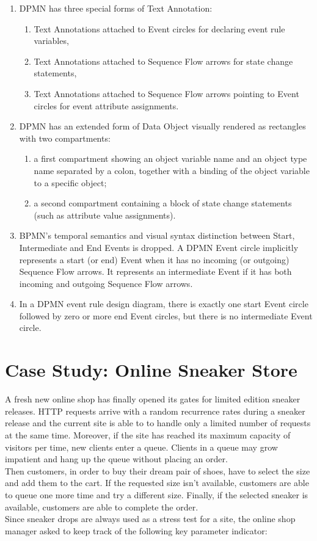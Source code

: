 \documentclass{article}
\begin{document}
\begin{enumerate}
\item DPMN has three special forms of Text Annotation:
	\begin{enumerate}
		\item Text Annotations attached to Event circles for declaring event rule variables,
		\item Text Annotations attached to Sequence Flow arrows for state change statements,
		\item Text Annotations attached to Sequence Flow arrows pointing to Event circles for event attribute assignments.
	\end{enumerate}
\item DPMN has an extended form of Data Object visually rendered as rectangles with two compartments:
	\begin{enumerate}
		\item a first compartment showing an object variable name and an object type name separated by a colon, together with a binding of the object variable to a specific object;
		\item a second compartment containing a block of state change statements (such as attribute value assignments).
	\end{enumerate}
\item BPMN's temporal semantics and visual syntax distinction between Start, Intermediate and End Events is dropped. A DPMN Event circle implicitly represents a start (or end) Event when it has no incoming (or outgoing) Sequence Flow arrows. It represents an intermediate Event if it has both incoming and outgoing Sequence Flow arrows.
\item In a DPMN event rule design diagram, there is exactly one start Event circle followed by zero or more end Event circles, but there is no intermediate Event circle.
\end{enumerate}




\section{Case Study: Online Sneaker Store}

A fresh new online shop has finally opened its gates for limited edition sneaker releases. HTTP requests arrive with a random recurrence rates during a sneaker release and the current site is able to to handle only a limited number of requests at the same time. Moreover, if the site has reached its maximum capacity of visitors per time, new clients enter a queue. Clients in a queue may grow impatient and hang up the queue without placing an order.\\
Then customers, in order to buy their dream pair of shoes, have to select the size and add them to the cart. If the requested size isn't available, customers are able to queue one more time and try a different size. Finally, if the selected sneaker is available, customers are able to complete the order. \\
Since sneaker drops are always used as a stress test for a site, the online shop manager asked to keep track of the following key parameter indicator:
\end{document}
